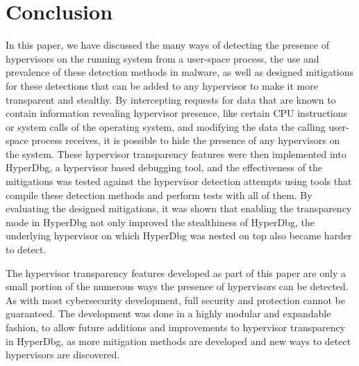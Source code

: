 \clearpage
\section{Conclusion}\label{s:conclusion}

In this paper, we have discussed the many ways of detecting the presence of hypervisors on the running system from a user-space process, 
the use and prevalence of these detection methods in malware, as well as designed mitigations for these detections that can be added to any hypervisor to make it more transparent and stealthy. 
By intercepting requests for data that are known to contain information revealing hypervisor presence, like certain CPU instructions or system calls of the operating system, 
and modifying the data the calling user-space process receives, it is possible to hide the presence of any hypervisors on the system. 
These hypervisor transparency features were then implemented into HyperDbg, a hypervisor based debugging tool, and the effectiveness of the mitigations was 
tested against the hypervisor detection attempts using tools that compile these detection methods and perform tests with all of them. By evaluating the designed mitigations, 
it was shown that enabling the transparency mode in HyperDbg not only improved the stealthiness of HyperDbg, the underlying hypervisor on which HyperDbg was nested on top also 
became harder to detect.

The hypervisor transparency features developed as part of this paper are only a small portion of the numerous ways the presence of hypervisors can be detected. 
As with most cybersecurity development, full security and protection cannot be guaranteed. The development was done in a highly modular and expandable fashion, 
to allow future additions and improvements to hypervisor transparency in HyperDbg, as more mitigation methods are developed and new ways to detect hypervisors are discovered. 



